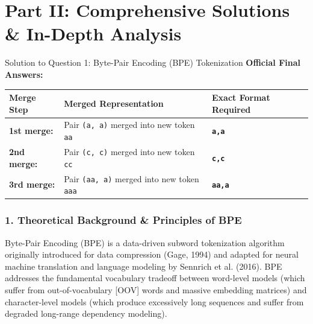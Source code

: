 \documentclass[11pt,a4paper]{article}
\begin{document}
\newpage

\section{Part II: Comprehensive Solutions \& In-Depth Analysis}

\begin{solutionbox}{Solution to Question 1: Byte-Pair Encoding (BPE) Tokenization}
\textbf{Official Final Answers:}
\begin{center}
\begin{tabularx}{0.88\textwidth}{lXl}
\toprule
\textbf{Merge Step} & \textbf{Merged Representation} & \textbf{Exact Format Required} \\
\midrule
\textbf{1st merge:} & Pair \texttt{(a, a)} merged into new token \texttt{aa} & \textbf{\texttt{a,a}} \\
\textbf{2nd merge:} & Pair \texttt{(c, c)} merged into new token \texttt{cc} & \textbf{\texttt{c,c}} \\
\textbf{3rd merge:} & Pair \texttt{(aa, a)} merged into new token \texttt{aaa} & \textbf{\texttt{aa,a}} \\
\bottomrule
\end{tabularx}
\end{center}

\subsubsection*{1. Theoretical Background \& Principles of BPE}
Byte-Pair Encoding (BPE) is a data-driven subword tokenization algorithm originally introduced for data compression (Gage, 1994) and adapted for neural machine translation and language modeling by Sennrich et al. (2016). BPE addresses the fundamental vocabulary tradeoff between word-level models (which suffer from out-of-vocabulary [OOV] words and massive embedding matrices) and character-level models (which produce excessively long sequences and suffer from degraded long-range dependency modeling).


\end{solutionbox}
\end{document}
